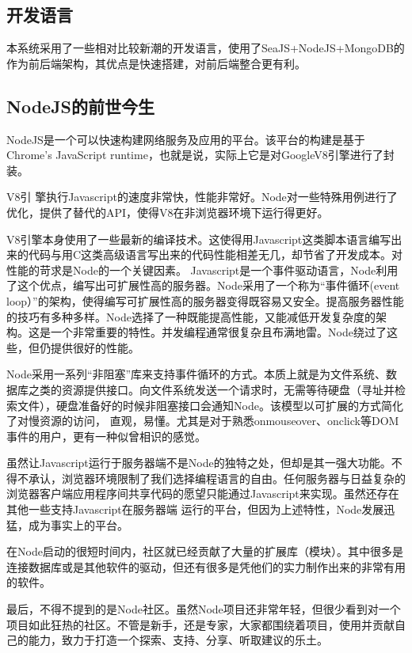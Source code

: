 
\subsection{开发语言}
\indent
本系统采用了一些相对比较新潮的开发语言，使用了SeaJS+NodeJS+MongoDB的作为前后端架构，其优点是快速搭建，对前后端整合更有利。

\subsection{NodeJS的前世今生}
\indent
NodeJS是一个可以快速构建网络服务及应用的平台。该平台的构建是基于Chrome's JavaScript runtime，也就是说，实际上它是对GoogleV8引擎进行了封装。

V8引 擎执行Javascript的速度非常快，性能非常好。Node对一些特殊用例进行了优化，提供了替代的API，使得V8在非浏览器环境下运行得更好。

V8引擎本身使用了一些最新的编译技术。这使得用Javascript这类脚本语言编写出来的代码与用C这类高级语言写出来的代码性能相差无几，却节省了开发成本。对性能的苛求是Node的一个关键因素。 Javascript是一个事件驱动语言，Node利用了这个优点，编写出可扩展性高的服务器。Node采用了一个称为“事件循环(event loop）”的架构，使得编写可扩展性高的服务器变得既容易又安全。提高服务器性能的技巧有多种多样。Node选择了一种既能提高性能，又能减低开发复杂度的架构。这是一个非常重要的特性。并发编程通常很复杂且布满地雷。Node绕过了这些，但仍提供很好的性能。

Node采用一系列“非阻塞”库来支持事件循环的方式。本质上就是为文件系统、数据库之类的资源提供接口。向文件系统发送一个请求时，无需等待硬盘（寻址并检索文件），硬盘准备好的时候非阻塞接口会通知Node。该模型以可扩展的方式简化了对慢资源的访问， 直观，易懂。尤其是对于熟悉onmouseover、onclick等DOM事件的用户，更有一种似曾相识的感觉。

虽然让Javascript运行于服务器端不是Node的独特之处，但却是其一强大功能。不得不承认，浏览器环境限制了我们选择编程语言的自由。任何服务器与日益复杂的浏览器客户端应用程序间共享代码的愿望只能通过Javascript来实现。虽然还存在其他一些支持Javascript在服务器端 运行的平台，但因为上述特性，Node发展迅猛，成为事实上的平台。

在Node启动的很短时间内，社区就已经贡献了大量的扩展库（模块）。其中很多是连接数据库或是其他软件的驱动，但还有很多是凭他们的实力制作出来的非常有用的软件。

最后，不得不提到的是Node社区。虽然Node项目还非常年轻，但很少看到对一个项目如此狂热的社区。不管是新手，还是专家，大家都围绕着项目，使用并贡献自己的能力，致力于打造一个探索、支持、分享、听取建议的乐土。

